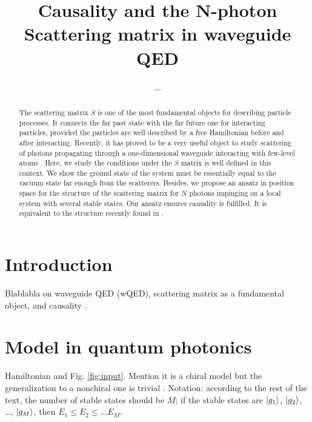 \documentclass[aps,pra,reprint,amsmath,amssymb]{revtex4-1}
\begin{document}
\title{Causality and the N-photon Scattering matrix in waveguide QED}

\author{...}


\begin{abstract}
The scattering matrix $S$ is one of the most fundamental objects for
describing particle processes. It connects the far past state with the
far future one for interacting particles, provided the particles are well described by a free
Hamiltonian before and after interacting. Recently, it has proved to be a very useful object to study scattering of photons propagating through a one-dimensional waveguide interacting with few-level atoms \cite{Fan2010}. Here, we study the conditions under the $S$ matrix is well defined in this context. We show the ground state of the system must be essentially equal to the vacuum state far enough from the scatterers. Besides, we propose an ansatz in position space for the structure of the scattering matrix for $N$ photons impinging on a local system with several stable states. Our ansatz ensures causality is fulfilled. It is equivalent to the structure recently found in \cite{Xu2016}.
\end{abstract}



\maketitle


\section{Introduction}

{\color{blue}Blablabla on waveguide QED (wQED), scattering matrix as a fundamental object, and causality \cite{weinberg1995,Xu2016}.}


\section{Model in quantum photonics} 

{\color{blue}Hamiltonian and Fig. \ref{fig:input}. Mention it is a chiral model but the generalization to a nonchiral one is trivial \cite{Fan2010}. Notation: according to the rest of the text, the number of stable states should be $M$; if the stable states are $\ket{g_1}$, $\ket{g_2}$, \dots, $\ket{g_M}$, then $E_1\leq E_2\leq \dots E_M$.}
\end{document}
